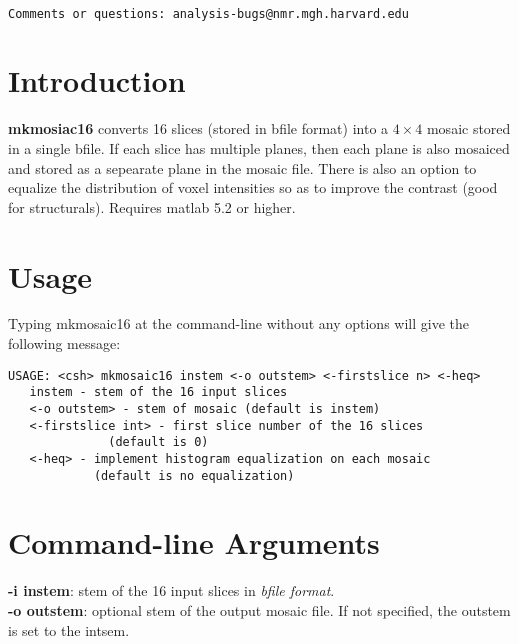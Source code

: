 \documentclass[10pt]{article}
\begin{document}
\begin{Large}
 \\
\end{Large}

\noindent 
\begin{verbatim}
Comments or questions: analysis-bugs@nmr.mgh.harvard.edu
\end{verbatim}

\section{Introduction}
{\bf mkmosiac16} converts 16 slices (stored in bfile format) into a $4
\times 4$ mosaic stored in a single bfile.  If each slice has multiple
planes, then each plane is also mosaiced and stored as a sepearate
plane in the mosaic file.  There is also an option to equalize the
distribution of voxel intensities so as to improve the contrast (good
for structurals). Requires matlab 5.2 or higher.\\

\section{Usage}
Typing mkmosaic16 at the command-line without any options will give the
following message:\\ 

\begin{small}
\begin{verbatim}
USAGE: <csh> mkmosaic16 instem <-o outstem> <-firstslice n> <-heq>
   instem - stem of the 16 input slices
   <-o outstem> - stem of mosaic (default is instem)
   <-firstslice int> - first slice number of the 16 slices 
              (default is 0)
   <-heq> - implement histogram equalization on each mosaic
            (default is no equalization)
\end{verbatim}
\end{small}

\section{Command-line Arguments}

\noindent
{\bf -i instem}: stem of the 16 input slices in {\em bfile format}. \\ 

\noindent
{\bf -o outstem}: optional stem of the output mosaic file.  If not
specified, the outstem is set to the intsem.\\
\end{document}
